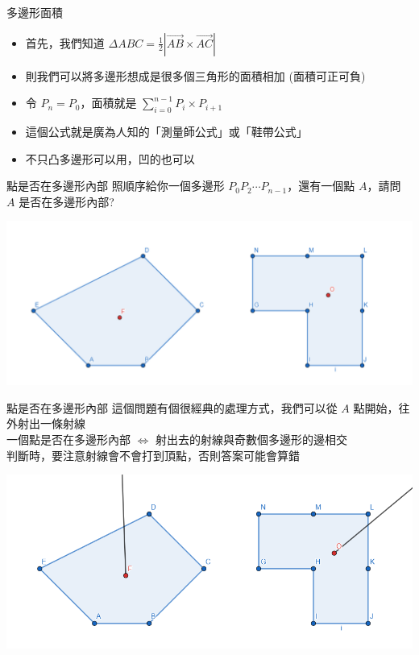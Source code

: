 \documentclass[aspectratio=169]{beamer}
\begin{document}
\begin{frame}{多邊形面積}
    \begin{itemize}
        \item 首先，我們知道 $\Delta ABC = \frac{1}{2}|\overrightarrow{AB} \times \overrightarrow{AC}|$ \item 則我們可以將多邊形想成是很多個三角形的面積相加 (面積可正可負)
        \item 令 $P_n = P_0$，面積就是 $\sum_{i=0}^{n-1} P_i \times P_{i+1}$
        \item 這個公式就是廣為人知的「測量師公式」或「鞋帶公式」
        \item 不只凸多邊形可以用，凹的也可以
    \end{itemize}
\end{frame}

\begin{frame}{點是否在多邊形內部}
    照順序給你一個多邊形 $P_0 P_2\cdots P_{n-1}$，還有一個點 $A$，請問 $A$ 是否在多邊形內部?
    \begin{center}
        \includegraphics[scale=0.5]{images/point_in_polygon.png}
    \end{center}
\end{frame}

\begin{frame}{點是否在多邊形內部}
    這個問題有個很經典的處理方式，我們可以從 $A$ 點開始，往外射出一條射線 \\
    \vspace{2.5mm}
    一個點是否在多邊形內部 $\iff$ 射出去的射線與奇數個多邊形的邊相交\\
    \vspace{2.5mm}
    判斷時，要注意射線會不會打到頂點，否則答案可能會算錯
    \begin{center}
        \includegraphics[scale=0.5]{images/point_in_polygon_2.png}
    \end{center}
\end{frame}
\end{document}
